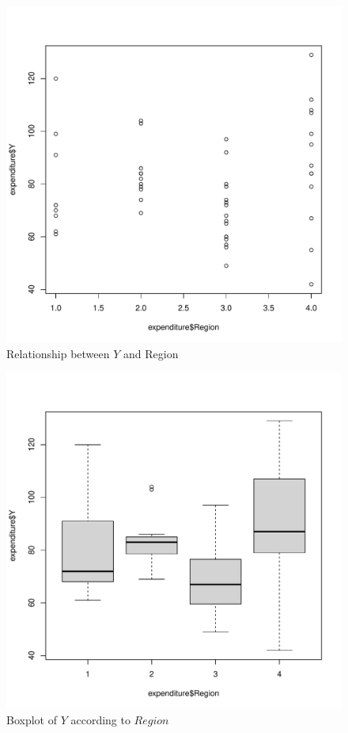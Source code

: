 \documentclass[12pt,letterpaper]{article}
\begin{document}
\begin{figure}[h!]\centering
	\caption{\footnotesize Relationship between $Y$ and Region }
	\label{fig:plot_1}
	\includegraphics[width=.85\textwidth]{regions.pdf}
\end{figure}

\begin{figure}[h!]\centering
	\caption{\footnotesize Boxplot of $Y$ according to $Region$ }
	\label{fig:plot_2}
	\includegraphics[width=.85\textwidth]{regions_boxplot.pdf}
\end{figure}
\end{document}
